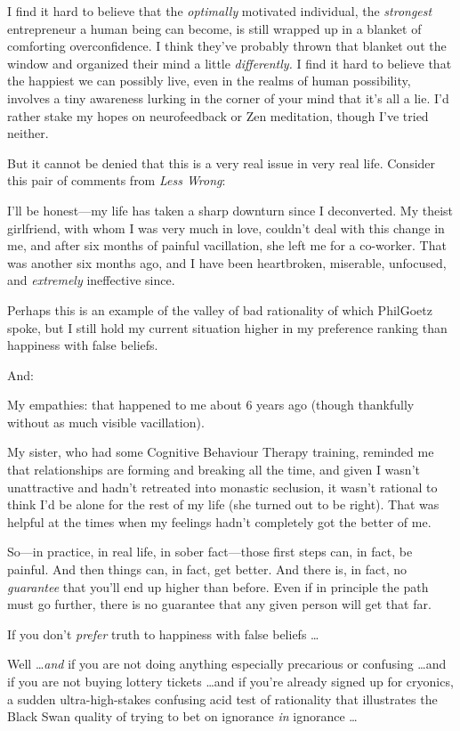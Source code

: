 {
 I find it hard to believe that the \textit{optimally} motivated
individual, the \textit{strongest} entrepreneur a human being can
become, is still wrapped up in a blanket of comforting overconfidence.
I think they've probably thrown that blanket out the
window and organized their mind a little \textit{differently.} I find
it hard to believe that the happiest we can possibly live, even in the
realms of human possibility, involves a tiny awareness lurking in the
corner of your mind that it's all a lie.
I'd rather stake my hopes on neurofeedback or Zen
meditation, though I've tried neither.}

{
 But it cannot be denied that this is a very real issue in very
real life. Consider this pair of comments from \textit{Less Wrong}:}

{
 I'll be honest---my life has taken a sharp
downturn since I deconverted. My theist girlfriend, with whom I was
very much in love, couldn't deal with this change in
me, and after six months of painful vacillation, she left me for a
co-worker. That was another six months ago, and I have been
heartbroken, miserable, unfocused, and \textit{extremely} ineffective
since.}

{
 Perhaps this is an example of the valley of bad rationality of
which PhilGoetz spoke, but I still hold my current situation higher in
my preference ranking than happiness with false beliefs.}

{
 And:}

{
 My empathies: that happened to me about 6 years ago (though
thankfully without as much visible vacillation).}

{
 My sister, who had some Cognitive Behaviour Therapy training,
reminded me that relationships are forming and breaking all the time,
and given I wasn't unattractive and
hadn't retreated into monastic seclusion, it
wasn't rational to think I'd be alone
for the rest of my life (she turned out to be right). That was helpful
at the times when my feelings hadn't completely got the
better of me.}

{
 So---in practice, in real life, in sober fact---those first steps
can, in fact, be painful. And then things can, in fact, get better. And
there is, in fact, no \textit{guarantee} that you'll
end up higher than before. Even if in principle the path must go
further, there is no guarantee that any given person will get that
far.}

{
 If you don't \textit{prefer} truth to happiness
with false beliefs \ldots}

{
 Well \ldots \textit{and} if you are not doing anything especially
precarious or confusing \ldots and if you are not buying lottery tickets
\ldots and if you're already signed up for cryonics, a
sudden ultra-high-stakes confusing acid test of rationality that
illustrates the Black Swan quality of trying to bet on ignorance
\textit{in} ignorance \ldots}

